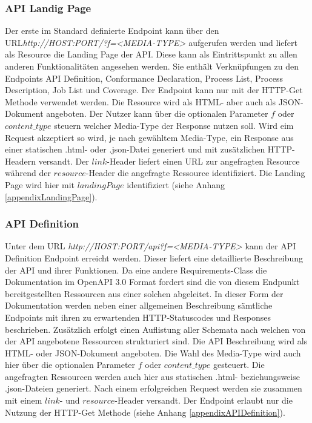 \subsubsection{API Landig Page}
Der erste im Standard definierte Endpoint kann über den URL\textit{http://HOST:PORT/?f=<MEDIA-TYPE>} aufgerufen werden und liefert als Resource die 
Landing Page der API. Diese kann als Eintrittspunkt zu allen anderen Funktionalitäten angesehen werden. Sie enthält Verknüpfungen zu den Endpoints API Definition, 
Conformance Declaration, Process List, Process Description, Job List und Coverage. Der Endpoint kann nur mit der HTTP-Get Methode verwendet werden. 
Die Resource wird als HTML- aber auch als JSON-Dokument angeboten. Der Nutzer kann über die optionalen Parameter $f$ oder $content\_type$ steuern welcher Media-Type der Response 
nutzen soll. Wird eim Request akzeptiert so wird, je nach gewähltem Media-Type, ein Response aus einer statischen .html- oder .json-Datei generiert und mit zusätzlichen 
HTTP-Headern versandt. Der $link$-Header liefert einen URL zur angefragten Resource während der $resource$-Header die angefragte Ressource identifiziert. 
Die Landing Page wird hier mit $landingPage$ identifiziert (siehe Anhang \ref{appendixLandingPage}). 

\subsubsection{API Definition}
Unter dem URL \textit{http://HOST:PORT/api?f=<MEDIA-TYPE>} kann der API Definition Endpoint erreicht werden. Dieser liefert eine detaillierte Beschreibung
der API und ihrer Funktionen.  Da eine andere Requirements-Class die Dokumentation im  OpenAPI 3.0 Format fordert sind die von diesem Endpunkt bereitgestellten Ressourcen aus 
einer solchen abgeleitet. In dieser Form der Dokumentation werden neben einer allgemeinen Beschreibung sämtliche Endpoints mit ihren zu erwartenden HTTP-Statuscodes und 
Responses beschrieben. Zusätzlich erfolgt einen Auflistung aller Schemata nach welchen von der API angebotene Ressourcen strukturiert sind. Die API Beschreibung wird
als HTML- oder JSON-Dokument angeboten. Die Wahl des Media-Type wird auch hier über die optionalen Parameter $f$ oder $content\_type$ gesteuert. Die angefragten Ressourcen 
werden auch hier aus statischen .html- beziehungsweise .json-Dateien generiert. Nach einem erfolgreichen Request werden sie zusammen mit 
einem $link$- und $resource$-Header versandt. Der Endpoint erlaubt nur die Nutzung der HTTP-Get Methode (siehe Anhang \ref{appendixAPIDefinition}).

